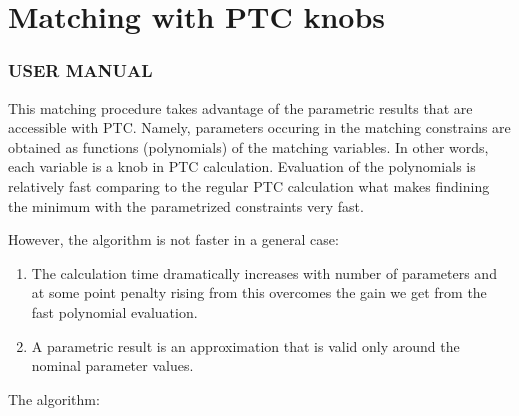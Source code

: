 


\section{Matching with PTC knobs}





\subsubsection{   USER MANUAL   }    This matching procedure takes advantage of the parametric results that  are accessible with PTC. Namely,  parameters occuring in the matching constrains are obtained as functions (polynomials) of the matching variables. In other words, each variable is a knob in PTC calculation. Evaluation of the polynomials is relatively fast comparing to the regular PTC calculation what makes findining the minimum with the parametrized constraints very fast. 

 However, the algorithm is not faster in a general case: 
\begin{enumerate}
	\item  The calculation time dramatically increases with number of parameters and at some point penalty rising from       this overcomes the gain we get from the fast polynomial evaluation.   
	\item  A parametric result is an approximation that is valid only around        the nominal parameter values.    
\end{enumerate}

 The algorithm: \\
 
